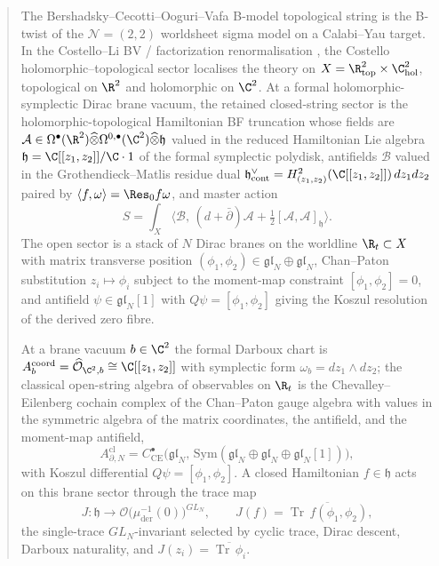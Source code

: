 \begin{abstract}

\noindent
The Bershadsky--Cecotti--Ooguri--Vafa B-model topological string
\cite{bcov} is the B-twist of the \(\mathcal N=(2,2)\) worldsheet
sigma model on a Calabi--Yau target.  In the Costello--Li BV /
factorization renormalisation
\cites{costello-renormalization}{costello-li-quantum-bcov}{costello-li-open-closed-bcov},
the Costello holomorphic--topological sector
\cite{costello-twistedM} localises the theory on
\(X=\R^2_{\mathrm{top}}\times\C^2_{\mathrm{hol}}\), topological on
\(\R^2\) and holomorphic on \(\C^2\).  At a formal
holomorphic-symplectic Dirac brane vacuum, the retained closed-string
sector is the holomorphic-topological Hamiltonian BF truncation whose
fields are
$\mathcal A\in\Omega^\bullet(\R^2)\widehat\otimes
\Omega^{0,\bullet}(\C^2)\widehat\otimes\mathfrak h$ valued in the
reduced Hamiltonian Lie algebra
$\mathfrak h=\C[[z_1,z_2]]/\C\cdot 1$ of the formal symplectic
polydisk, antifields $\mathcal B$ valued in the
Grothendieck--Matlis residue dual
$\mathfrak h^\vee_{\mathrm{cont}}=
H^2_{(z_1,z_2)}(\C[[z_1,z_2]])\,dz_1dz_2$ paired by
$\langle f,\omega\rangle=\Res_0 f\omega$, and master action
\[
  S=\int_X\bigl\langle\mathcal B,\,
        (d+\bar\partial)\mathcal A
        +\tfrac12[\mathcal A,\mathcal A]_{\mathfrak h}\bigr\rangle.
\]
The open sector is a stack of $N$ Dirac branes on the worldline
$\R_t\subset X$ with matrix transverse position
$(\phi_1,\phi_2)\in\mathfrak{gl}_N\oplus\mathfrak{gl}_N$,
Chan--Paton substitution $z_i\mapsto\phi_i$ subject to the
moment-map constraint $[\phi_1,\phi_2]=0$, and antifield
$\psi\in\mathfrak{gl}_N[1]$ with $Q\psi=[\phi_1,\phi_2]$ giving the
Koszul resolution of the derived zero fibre.

\medskip\noindent
At a brane vacuum $b\in\C^2$ the formal Darboux chart is
$A_b^{\mathrm{coord}}=\widehat{\mathcal O}_{\C^2,b}\cong
\C[[z_1,z_2]]$ with symplectic form $\omega_b=dz_1\wedge dz_2$; the
classical open-string algebra of observables on $\R_t$ is the
Chevalley--Eilenberg cochain complex
of the Chan--Paton gauge algebra with values in the symmetric
algebra of the matrix coordinates, the antifield, and the
moment-map antifield,
\[
  A^{\mathrm{cl}}_{\partial,N}
   =C^\bullet_{\mathrm{CE}}\bigl(\mathfrak{gl}_N,\,
       \mathrm{Sym}(\mathfrak{gl}_N\oplus\mathfrak{gl}_N
                    \oplus\mathfrak{gl}_N[1])\bigr),
\]
with Koszul differential $Q\psi=[\phi_1,\phi_2]$.  A closed
Hamiltonian $f\in\mathfrak h$ acts on this brane sector through
the trace map
\[
  J\colon\mathfrak h\longrightarrow
       \mathcal O\bigl(\mu^{-1}_{\mathrm{der}}(0)\bigr)^{GL_N},
  \qquad
  J(f)=\overline{\operatorname{Tr}\,f(\phi_1,\phi_2)},
\]
the single-trace \(GL_N\)-invariant selected by cyclic trace, Dirac
descent, Darboux naturality, and
\(J(z_i)=\overline{\operatorname{Tr}\,\phi_i}\).


\end{abstract}
